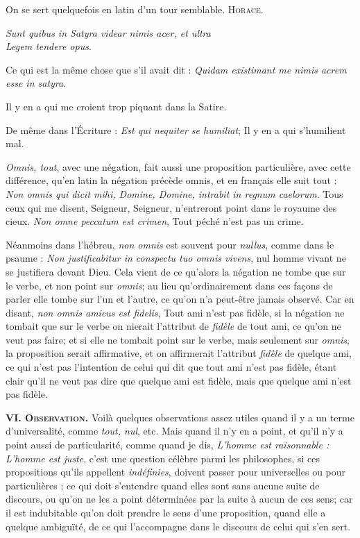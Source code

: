On se sert quelquefois en latin d'un tour semblable. {\scshape Horace}.

\begin{center}\emph{Sunt quibus in Satyra videar nimis acer, et ultra
\\Legem tendere opus}.\end{center}

Ce qui est la même chose que s'il avait dit : \emph{Quidam existimant me nimis acrem esse in satyra}.

Il y en a qui me croient trop piquant dans la Satire.

De même dans l'Écriture : \emph{Est qui nequiter se humiliat}; Il y en a qui s'humilient mal.

\emph{Omnis, tout}, avec une négation, fait aussi une proposition particulière, avec cette différence, qu'en latin la négation précède omnis, et en français elle suit tout : \emph{Non omnis qui dicit mihi, Domine, Domine, intrabit in regnum caelorum}. Tous ceux qui me disent, Seigneur, Seigneur, n'entreront point dans le royaume des cieux. \emph{Non omne peccatum est crimen}, Tout péché n'est pas un crime.

Néanmoins dans l'hébreu, \emph{non omnis} est souvent pour \emph{nullus}, comme dans le psaume : \emph{Non justificabitur in conspectu tuo omnis vivens}, nul homme vivant ne se justifiera devant Dieu. Cela vient de ce qu'alors la négation ne tombe que sur le verbe, et non point sur \emph{omnis}; au lieu qu'ordinairement dans ces façons de parler elle tombe sur l'un et l'autre, ce qu'on n'a peut-être jamais observé. Car en disant, \emph{non omnis amicus est fidelis}, Tout ami n'est pas fidèle, si la négation ne tombait que sur le verbe on nierait l'attribut de \emph{fidèle} de tout ami, ce qu'on ne veut pas faire; et si elle ne tombait point sur le verbe, mais seulement sur \emph{omnis}, la proposition serait affirmative, et on affirmerait l'attribut \emph{fidèle} de quelque ami, ce qui n'est pas l'intention de celui qui dit que tout ami n'est pas fidèle, étant clair qu'il ne veut pas dire que quelque ami est fidèle, mais que quelque ami n'est pas fidèle.

\bigbreak
{\bfseries\scshape VI. Observation.} Voilà quelques observations assez utiles quand il y a un terme d'universalité, comme \emph{tout, nul}, etc. Mais quand il n'y en a point, et qu'il n'y a point aussi de particularité, comme quand je dis, \emph{L'homme est raisonnable : L'homme est juste}, c'est une question célèbre parmi les philosophes, si ces propositions qu'ils appellent \emph{indéfinies}, doivent passer pour universelles ou pour particulières ; ce qui doit s'entendre quand elles sont sans aucune suite de discours, ou qu'on ne les a point déterminées par la suite à aucun de ces sens; car il est indubitable qu'on doit prendre le sens d'une proposition, quand elle a quelque ambiguïté, de ce qui l'accompagne dans le discours de celui qui s'en sert.

